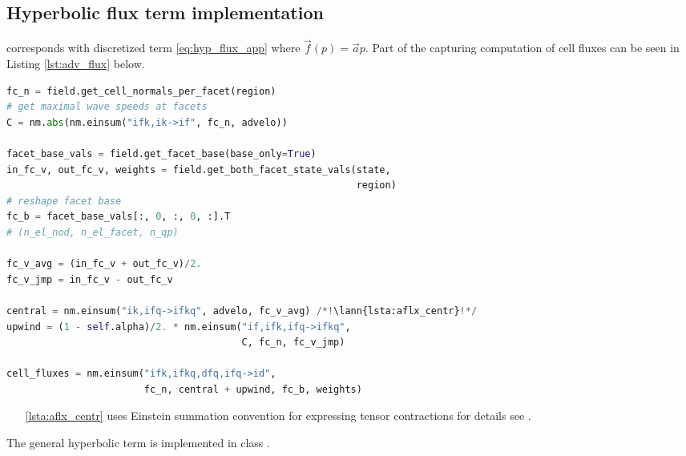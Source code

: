 \subsection{Hyperbolic flux term implementation}
\label{se:adv_flux_term_imp}
 corresponds with discretized term \eqref{eq:hyp_flux_app} 
where $\vec{f}(p) = \vec{a}p$. Part of the  capturing computation of 
cell fluxes can be seen in Listing \ref{lst:adv_flux} below. 
\setcounter{lstannotation}{0}
\begin{lstlisting}[language=Python, caption=Computation of advection cell 
fluxes \label{lst:adv_flux}]
fc_n = field.get_cell_normals_per_facet(region)
# get maximal wave speeds at facets
C = nm.abs(nm.einsum("ifk,ik->if", fc_n, advelo))

facet_base_vals = field.get_facet_base(base_only=True)
in_fc_v, out_fc_v, weights = field.get_both_facet_state_vals(state,
                                                             region)
# reshape facet base
fc_b = facet_base_vals[:, 0, :, 0, :].T
# (n_el_nod, n_el_facet, n_qp)

fc_v_avg = (in_fc_v + out_fc_v)/2.
fc_v_jmp = in_fc_v - out_fc_v

central = nm.einsum("ik,ifq->ifkq", advelo, fc_v_avg) /*!\lann{lsta:aflx_centr}!*/
upwind = (1 - self.alpha)/2. * nm.einsum("if,ifk,ifq->ifkq",
                                         C, fc_n, fc_v_jmp)

cell_fluxes = nm.einsum("ifk,ifkq,dfq,ifq->id",
                        fc_n, central + upwind, fc_b, weights)
\end{lstlisting}
\begin{itemize}
    \item[\ref{lsta:aflx_centr}]  uses Einstein summation convention for 
    expressing tensor contractions for details see \cite{einsum-doc}.
\end{itemize}
The general hyperbolic term is implemented in class 
.



